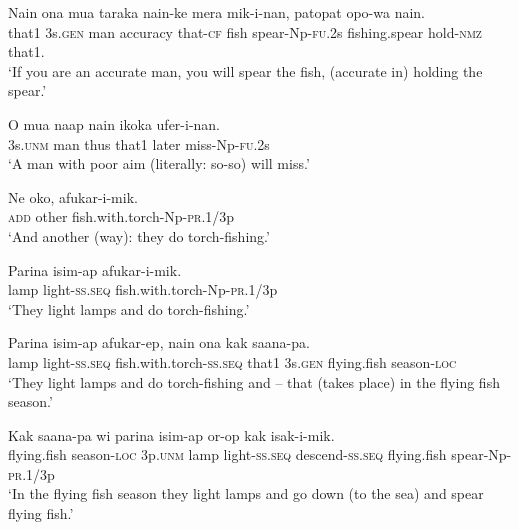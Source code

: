 {\ea\label{ex:a:x35}
\gll  Nain  ona  mua  taraka  nain-ke  mera  mik-i-nan,       patopat  opo-wa  nain. \\
that1  3s.\textsc{gen}  man  accuracy  that-\textsc{cf}  fish  spear-Np-\textsc{fu}.2s   fishing.spear  hold-\textsc{nmz}  that1. \\


\glt ‘If you are an accurate man, you will spear the fish, (accurate in) holding the spear.’ \\
\z


\ea\label{ex:a:x36}
\gll  O  mua  naap  nain  ikoka  ufer-i-nan. \\
3s.\textsc{unm}  man  thus  that1  later  miss-Np-\textsc{fu}.2s \\
\glt ‘A man with poor aim (literally: so-so) will miss.’ \\
\z


\ea\label{ex:a:x37}
\gll  Ne  oko,  afukar-i-mik. \\
\textsc{add}  other  fish.with.torch-Np-\textsc{pr}.1/3p \\
\glt ‘And another (way): they do torch-fishing.’ \\
\z


\ea\label{ex:a:x38}
\gll  Parina  isim-ap  afukar-i-mik. \\
lamp  light-\textsc{ss.seq}  fish.with.torch-Np-\textsc{pr}.1/3p \\
\glt ‘They light lamps and do torch-fishing.’ \\
\z


\ea\label{ex:a:x39}
\gll  Parina  isim-ap  afukar-ep,  nain            ona  kak  saana-pa. \\
lamp  light-\textsc{ss.seq}  fish.with.torch-\textsc{ss.seq}  that1  3s.\textsc{gen}  flying.fish  season-\textsc{loc} \\


\glt ‘They light lamps and do torch-fishing and – that (takes place) in the flying fish season.’ \\
\z


\ea\label{ex:a:x40}
\gll  Kak  saana-pa  wi  parina  isim-ap              or-op  kak  isak-i-mik. \\
flying.fish  season-\textsc{loc}  3p.\textsc{unm}  lamp  light-\textsc{ss.seq}   descend-\textsc{ss.seq}  flying.fish  spear-Np-\textsc{pr}.1/3p \\


\glt ‘In the flying fish season they light lamps and go down (to the sea) and spear flying fish.’ \\
\z


}
